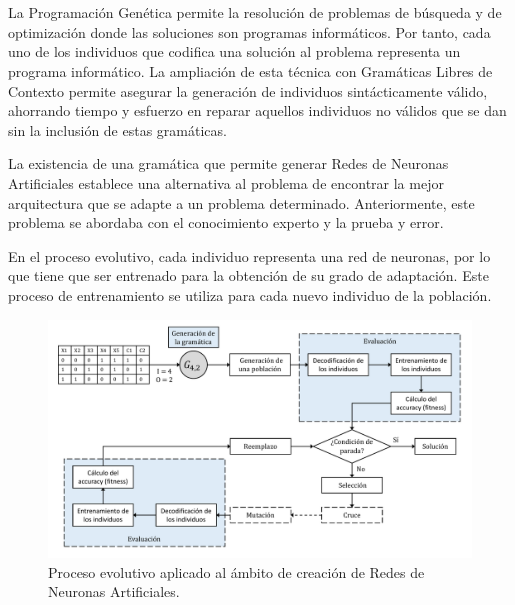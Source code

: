 \documentclass[spanish,a4paper,12pt,twoside]{report}
\begin{document}
  \chapter*{\vspace{-3cm}{\LARGE 4. Planteamiento del problema}}
  \setcounter{figure}{14}
  \vspace{-1cm}
  La Programación Genética permite la resolución de problemas de búsqueda y de optimización donde las soluciones son programas informáticos. Por tanto, cada uno de los individuos que codifica una solución al problema representa un programa informático. La ampliación de esta técnica con Gramáticas Libres de Contexto permite asegurar la generación de individuos sintácticamente válido, ahorrando tiempo y esfuerzo en reparar aquellos individuos no válidos que se dan sin la inclusión de estas gramáticas. \par
  La existencia de una gramática que permite generar Redes de Neuronas Artificiales establece una alternativa al problema de encontrar la mejor arquitectura que se adapte a un problema determinado. Anteriormente, este problema se abordaba con el conocimiento experto y la prueba y error. \par
  En el proceso evolutivo, cada individuo representa una red de neuronas, por lo que tiene que ser entrenado para la obtención de su grado de adaptación. Este proceso de entrenamiento se utiliza para cada nuevo individuo de la población. \par
  \begin{figure}[H]
    \centering
    \includegraphics[width = 1\textwidth]{resources/Fig15.pdf}
    \caption{Proceso evolutivo aplicado al ámbito de creación de Redes de Neuronas Artificiales.}
    \label{fig:15}
  \end{figure} \par
\end{document}
